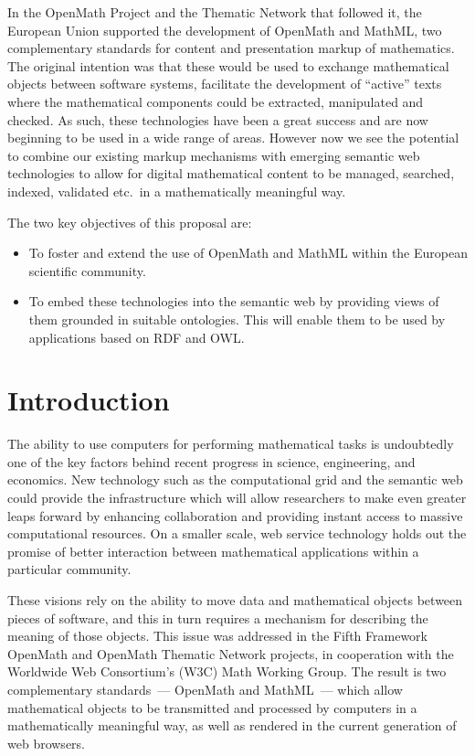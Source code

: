 \documentclass[draft]{artikel3}
\begin{document}
In the OpenMath Project and the Thematic Network that followed it, the
European Union supported the development of OpenMath and MathML, two
complementary standards for content and presentation markup of
mathematics.  The original intention was that these would be used to
exchange mathematical objects between software systems, facilitate the
development of ``active'' texts where the mathematical components
could be extracted, manipulated and checked.  As such, these
technologies have been a great success and are now beginning to be
used in a wide range of areas.  However now we see the potential to
combine our existing markup mechanisms with emerging semantic web
technologies to allow for digital mathematical content to be managed,
searched, indexed, validated etc.~in a mathematically meaningful way.

The two key objectives of this proposal are:
\begin{itemize}
\item To foster and extend the use of OpenMath and MathML within the
  European scientific community.
\item To embed these technologies into the semantic web by providing
  views of them grounded in suitable ontologies.  This will enable
  them to be used by applications based on RDF and OWL.
\end{itemize}


\section{Introduction}

The ability to use computers for performing mathematical tasks is
undoubtedly one of the key factors behind recent progress in science,
engineering, and economics.  New technology such as the computational
grid and the semantic web could provide the infrastructure which will
allow researchers to make even greater leaps forward by enhancing
collaboration and providing instant access to massive computational
resources.  On a smaller scale, web service technology holds out the
promise of better interaction between mathematical applications within
a particular community.

These visions rely on the ability to move data and mathematical
objects between pieces of software, and this in turn requires a
mechanism for describing the meaning of those objects.  This issue was
addressed in the Fifth Framework OpenMath and OpenMath Thematic
Network projects, in cooperation with the Worldwide Web Consortium's
(W3C) Math Working Group.  The result is two complementary
standards~--- OpenMath and MathML~--- which allow mathematical objects
to be transmitted and processed by computers in a mathematically
meaningful way, as well as rendered in the current generation of web
browsers.
\end{document}

